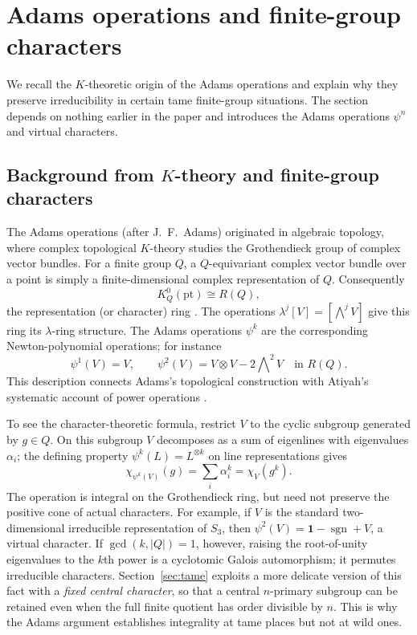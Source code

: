 \documentclass[11pt]{article}
\theoremstyle{plain}
\theoremstyle{definition}
\begin{document}
\section{Adams operations and finite-group characters}\label{sec:adams}
We recall the $K$-theoretic origin of the Adams operations and
explain why they preserve irreducibility in certain tame
finite-group situations. The section depends on nothing earlier in the paper and introduces the Adams operations $\psi^n$ and virtual characters.
\subsection*{Background from $K$-theory and finite-group characters}
The Adams operations (after J.~F.~Adams) originated in algebraic topology, where complex topological
$K$-theory studies the Grothendieck group of complex vector bundles. For a finite
group $Q$, a $Q$-equivariant complex vector bundle over a point is simply a
finite-dimensional complex representation of $Q$. Consequently
\[
K_Q^0(\mathrm{pt})\cong R(Q),
\]
the representation (or character) ring \cite{SegalK}. The operations
$\lambda^j[V]=[\bigwedge^jV]$ give this ring its $\lambda$-ring structure.
The Adams operations $\psi^k$ are the corresponding Newton-polynomial
operations; for instance
\[
\psi^1(V)=V,\qquad
\psi^2(V)=V\otimes V-2\bigwedge\nolimits^2V
\quad\text{in }R(Q).
\]
This description connects Adams's topological construction \cite{Adams62}
with Atiyah's systematic account of power operations \cite{Atiyah66}.

To see the character-theoretic formula, restrict $V$ to the cyclic subgroup
generated by $g\in Q$. On this subgroup $V$ decomposes as a sum of eigenlines
with eigenvalues $\alpha_i$; the defining property $\psi^k(L)=L^{\otimes k}$
on line representations gives
\begin{equation}\label{eq:adams-def-background}
\boxed{\quad\chi_{\psi^k(V)}(g)=\sum_i\alpha_i^k
      =\chi_V(g^k).\quad}
\end{equation}
The operation is integral on the Grothendieck ring, but need not preserve the
positive cone of actual characters. For example, if $V$ is the standard
two-dimensional irreducible representation of $S_3$, then
$\psi^2(V)=\mathbf1-\operatorname{sgn}+V$, a virtual character.
If $\gcd(k,|Q|)=1$, however, raising the root-of-unity eigenvalues to the
$k$th power is a cyclotomic Galois automorphism; it permutes irreducible
characters. Section~\ref{sec:tame} exploits a more delicate version of this
fact with a \emph{fixed central character}, so that a central $n$-primary
subgroup can be retained even when the full finite quotient has order
divisible by $n$. This is why the Adams argument establishes integrality at
tame places but not at wild ones.
\end{document}
